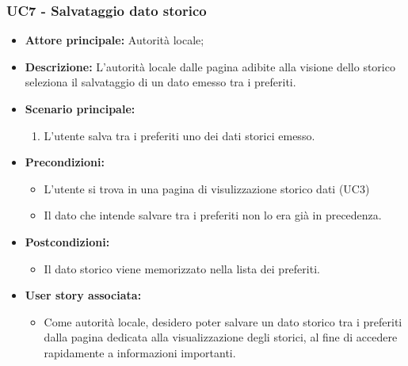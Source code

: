 \documentclass{article}
\begin{document}
\subsubsection{UC7 - Salvataggio dato storico}
\begin{itemize}
    \item \textbf{Attore principale:} Autorità locale;
    \item \textbf{Descrizione:} L’autorità locale dalle pagina adibite alla visione dello storico seleziona il salvataggio di un dato emesso tra i preferiti.
    \item \textbf{Scenario principale:}
          \begin{enumerate}
              \item L'utente salva tra i preferiti uno dei dati storici emesso.
          \end{enumerate}
    \item \textbf{Precondizioni:}
          \begin{itemize}
              \item  L'utente si trova in una pagina di visulizzazione storico dati (UC3)
              \item  Il dato che intende salvare tra i preferiti non lo era già in precedenza.
          \end{itemize}
    \item \textbf{Postcondizioni:}
          \begin{itemize}
              \item  Il dato storico viene memorizzato nella lista dei preferiti.
          \end{itemize}
    \item \textbf{User story associata:}
          \begin{itemize}
              \item Come autorità locale, desidero poter salvare un dato storico tra i preferiti dalla pagina dedicata alla visualizzazione degli storici, al fine di accedere rapidamente a informazioni importanti.
          \end{itemize}
\end{itemize}
\end{document}
